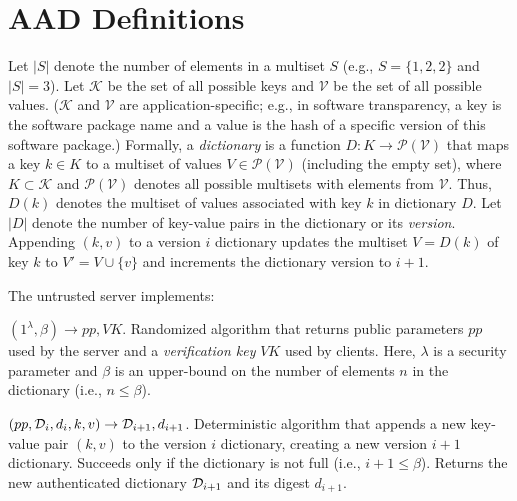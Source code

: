 \section{AAD Definitions}
\label{s:prelim:notation:dictionaries}

Let $|S|$ denote the number of elements in a multiset $S$ (e.g., $S=\{1,2,2\}$ and $|S|=3$).
Let $\mathcal{K}$ be the set of all possible keys and $\mathcal{V}$ be the set of all possible values.
($\mathcal{K}$ and $\mathcal{V}$ are application-specific; e.g., in software transparency, a key is the software package name and a value is the hash of a specific version of this software package.)
Formally, a \textit{dictionary} is a function $D : K \rightarrow \mathcal{P}(\mathcal{V})$ that maps a key $k\in K$ to a multiset of values $V\in\mathcal{P}(\mathcal{V})$ (including the empty set), where $K\subset \mathcal{K}$ and $\mathcal{P}(\mathcal{V})$ denotes all possible multisets with elements from $\mathcal{V}$.
Thus, $D(k)$ denotes the multiset of values associated with key $k$ in dictionary $D$.
Let $|D|$ denote the number of key-value pairs in the dictionary or its \textit{version}.
Appending $(k,v)$ to a version $i$ dictionary updates the multiset $V = D(k)$ of key $k$ to $V' = V \cup \{v\}$ and increments the dictionary version to $i+1$.

The untrusted server implements:
\vspace{.5em}

\api {\setup}$(1^\lambda, \beta) \rightarrow pp, VK$.
Randomized algorithm that returns public parameters $pp$ used by the server and a \textit{verification key} $VK$ used by clients.
Here, $\lambda$ is a security parameter and $\beta$ is an upper-bound on the number of elements $n$ in the dictionary (i.e., $n \le \beta$).

\api {\append}$(pp, \mathcal{D}_i, d_i, k,v) \rightarrow \mathcal{D}_{i+1}, d_{i+1}$.
Deterministic algorithm that appends a new key-value pair $(k,v)$ to the version $i$ dictionary, creating a new version $i+1$ dictionary.
Succeeds only if the dictionary is not full (i.e., $i + 1 \le \beta$).
Returns the new authenticated dictionary $\mathcal{D}_{i+1}$ and its digest $d_{i+1}$.

